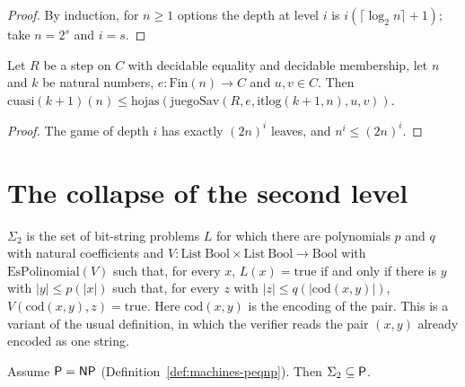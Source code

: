 \begin{proof}
  \leanok
  By induction, for $n \ge 1$ options the depth at level $i$ is $i (\lceil \log_2 n \rceil + 1)$; take
  $n = 2^s$ and $i = s$.
\end{proof}

\begin{theorem}
  \label{thm:machines-savitch-quasi}
  \leanok
  Let $R$ be a step on $C$ with decidable equality and decidable membership, let $n$ and $k$ be natural
  numbers, $e : \mathrm{Fin}(n) \to C$ and $u, v \in C$. Then
  $\mathrm{cuasi}(k + 1)(n) \le \mathrm{hojas}(\mathrm{juegoSav}(R, e, \mathrm{itlog}(k + 1, n), u, v))$.
\end{theorem}

\begin{proof}
  \leanok
  The game of depth $i$ has exactly $(2n)^i$ leaves, and $n^i \le (2n)^i$.
\end{proof}

\section{The collapse of the second level}
\label{sec:machines-collapse}

\begin{definition}
  \label{def:machines-sigma2}
  \leanok
  $\Sigma_2$ is the set of bit-string problems $L$ for which there are polynomials $p$ and $q$ with natural
  coefficients and $V : \mathrm{List}\ \mathrm{Bool} \times \mathrm{List}\ \mathrm{Bool} \to \mathrm{Bool}$ with
  $\mathrm{EsPolinomial}(V)$ such that, for every $x$, $L(x) = \mathrm{true}$ if and only if there is $y$ with
  $|y| \le p(|x|)$ such that, for every $z$ with $|z| \le q(|\mathrm{cod}(x, y)|)$,
  $V(\mathrm{cod}(x, y), z) = \mathrm{true}$. Here $\mathrm{cod}(x, y)$ is the encoding of the pair. This is a
  variant of the usual definition, in which the verifier reads the pair $(x, y)$ already encoded as one
  string.
  \own{}
\end{definition}

\begin{theorem}[If P = NP then the second level is in P]
  \label{thm:machines-collapse}
  \leanok
  Assume $\mathsf{P} = \mathsf{NP}$ (Definition~\ref{def:machines-peqnp}). Then $\Sigma_2 \subseteq \mathsf{P}$.
\end{theorem}

